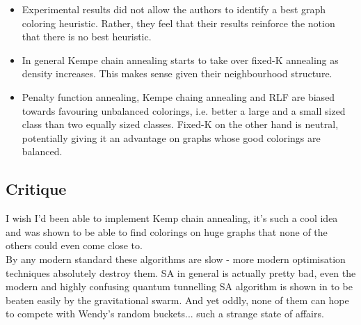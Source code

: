 \begin{itemize}
	\item Experimental results did not allow the authors to identify a best graph coloring heuristic. Rather, they feel that their results reinforce the notion that there is no best heuristic.
	\item In general Kempe chain annealing starts to take over fixed-K annealing as density increases. This makes sense given their neighbourhood structure.
	\item Penalty function annealing, Kempe chaing annealing and RLF are biased towards favouring unbalanced colorings, i.e. better a large and a small sized class than two equally sized classes. Fixed-K on the other hand is neutral, potentially giving it an advantage on graphs whose good colorings are balanced.
	\end{itemize}

\subsection{Critique}
I wish I'd been able to implement Kemp chain annealing, it's such a cool idea and was shown to be able to find colorings on huge graphs that none of the others could even come close to.\\
By any modern standard these algorithms are slow - more modern optimisation techniques absolutely destroy them. SA in general is actually pretty bad, even the modern and highly confusing quantum tunnelling SA algorithm is shown in to be beaten easily by the gravitational swarm. And yet oddly, none of them can hope to compete with Wendy's random buckets... such a strange state of affairs.



